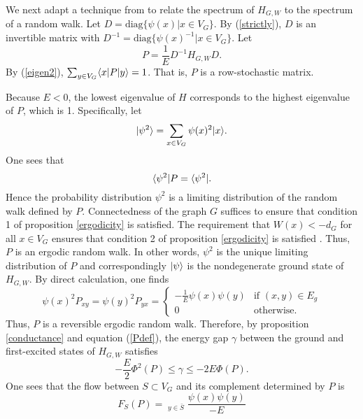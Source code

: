 We next adapt a technique from \cite{ATS03, BT09, AP10} to relate the
spectrum of $H_{G,W}$ to the spectrum of a random walk. Let $D =
\mathrm{diag}\{\psi(x)|x \in V_G\}$. By (\ref{strictly}), $D$ is an
invertible matrix with $D^{-1} = \mathrm{diag}\{\psi(x)^{-1}|x \in
V_G\}$. Let
\begin{equation}
\label{Pdef}
P = \frac{1}{E} D^{-1} H_{G,W} D.
\end{equation}
By (\ref{eigen2}), $\sum_{y \in V_G} \langle x| P |y\rangle = 1$. That is,
$P$ is a row-stochastic matrix.

Because $E < 0$, the lowest eigenvalue of $H$ corresponds to the
highest eigenvalue of $P$, which is 1. Specifically, let
\begin{equation}
|\psi^2\rangle = \sum_{x \in V_G} \psi(x)^2 |x\rangle.
\end{equation}
One sees that
\begin{equation}
\langle \psi^2| P = \langle \psi^2|.
\end{equation}
Hence the probability distribution $\psi^2$ is a limiting distribution
of the random walk defined by $P$. Connectedness of the graph $G$
suffices to ensure that condition 1 of proposition \ref{ergodicity} is
satisfied. The requirement that $W(x) < -d_G$ for all $x
\in V_G$ ensures that condition 2 of proposition \ref{ergodicity} is
satisfied \cite{Sinclair}. Thus, $P$ is an ergodic random walk. In
other words, $\psi^2$ is the unique limiting distribution of $P$ and
correspondingly $|\psi\rangle$ is the nondegenerate ground state of
$H_{G,W}$. By direct calculation, one finds
\begin{equation}
\psi(x)^2 P_{xy} = \psi(y)^2 P_{yx} = \left \{ \begin{array}{cl}
-\frac{1}{E} \psi(x) \psi(y) & \textrm{if $(x,y) \in E_g$}\\
0 & \textrm{otherwise}.
\end{array} \right.
\end{equation}
Thus, $P$ is a reversible ergodic random walk. Therefore, by
proposition \ref{conductance} and equation (\ref{Pdef}), the energy
gap $\gamma$ between the ground and first-excited states of $H_{G,W}$
satisfies
\begin{equation}
\label{bounds}
-\frac{E}{2} \Phi^2(P) \leq \gamma \leq -2E \Phi(P).
\end{equation}
One sees that the flow between $S \subset V_G$ and its complement
determined by $P$ is
\begin{equation}
F_S(P) = \mathop{\sum_{x \in S}}_{y \in \bar{S}} \frac{\psi(x)
  \psi(y)}{-E}
\end{equation}
